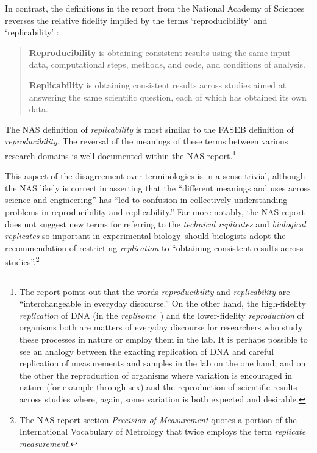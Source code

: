  In contrast, the definitions in the report from the National Academy of Sciences reverses the relative
	 fidelity implied by the terms `reproducibility' and `replicability' \cite[p.4]{committeeonreproducibilityandreplicabilityinscience2019reproducibility}:
\begin{quote}
	\textbf{Reproducibility} is obtaining consistent results using the same input data, computational
	steps, methods, and code, and conditions of analysis.  \medskip

	\textbf{Replicability} is obtaining consistent results across studies aimed at answering the same
	scientific question, each of which has obtained its own data.
\end{quote}

The NAS definition of \emph{replicability} is most similar to the FASEB definition of \emph{reproducibility}.
The reversal of the meanings of these terms between various research domains is well documented within the NAS report.\footnote{
	The report points out that the words \emph{reproducibility} and \emph{replicability} are
		``interchangeable in everyday discourse.''
	On the other hand, the high-fidelity \emph{replication} of DNA (in the \emph{replisome}~\cite{spenkelink_recycling_2019})
		and the lower-fidelity \emph{reproduction}
		of organisms both are matters of everyday discourse for researchers who study these processes in nature or employ them in the lab.
		It is perhaps possible to see an analogy between the exacting replication of DNA and careful replication of measurements and samples
		in the lab on the one hand; and on the other the reproduction of organisms where variation is encouraged in nature
		(for example through sex) and the reproduction of scientific results across studies where, again, some variation is both
		expected and desirable.}

This aspect of the disagreement over terminologies is in a sense trivial, although the NAS likely is correct in
	asserting that the ``different meanings and uses across science and engineering'' has ``led to confusion in collectively
	understanding problems in reproducibility and replicability.''
Far more notably, the NAS report does not suggest new terms for referring to the \emph{technical replicates}
	and  \emph{biological replicates} so important in experimental biology--should biologists adopt the recommendation
	of restricting \emph{replication} to ``obtaining consistent results across studies''.\footnote{
		The NAS report section \emph{Precision of Measurement} quotes a portion of the International Vocabulary of
		Metrology that twice employs the term \emph{replicate measurement}.
	}

